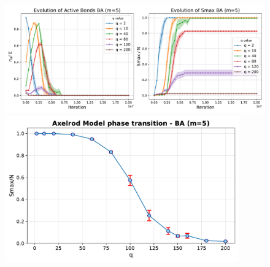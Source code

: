 \begin{figure}[htbp]
    \centering
    \begin{minipage}{0.58\textwidth}
        \centering
        \includegraphics[width=1.\textwidth]{figures/task30_plots/evolution_plot_BA.pdf}
        \end{minipage}
    \hfill
    \begin{minipage}{0.4\textwidth}
        \centering
        \includegraphics[width=0.9\textwidth]{figures/task30_plots/phase_transition_BA.pdf}
    \end{minipage}
\end{figure}

